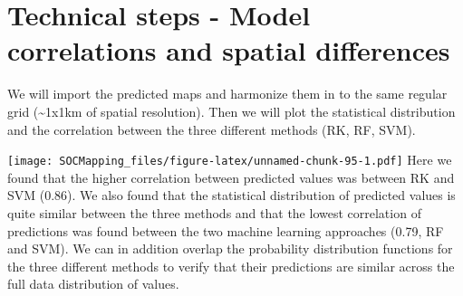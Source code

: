 \documentclass[10pt,b5paper,]{book}
\newenvironment{Shaded}{\begin{snugshade}}{\end{snugshade}}
\newcommand{\CommentTok}[1]{\textcolor[rgb]{0.56,0.35,0.01}{\textit{#1}}}
\newcommand{\DataTypeTok}[1]{\textcolor[rgb]{0.13,0.29,0.53}{#1}}
\newcommand{\KeywordTok}[1]{\textcolor[rgb]{0.13,0.29,0.53}{\textbf{#1}}}
\newcommand{\NormalTok}[1]{#1}
\newcommand{\OtherTok}[1]{\textcolor[rgb]{0.56,0.35,0.01}{#1}}
\newcommand{\StringTok}[1]{\textcolor[rgb]{0.31,0.60,0.02}{#1}}
\theoremstyle{definition}
\theoremstyle{definition}
\theoremstyle{definition}
\theoremstyle{remark}
\begin{document}
\hypertarget{technical-steps---model-correlations-and-spatial-differences}{%
\section{Technical steps - Model correlations and spatial
differences}\label{technical-steps---model-correlations-and-spatial-differences}}

We will import the predicted maps and harmonize them in to the same
regular grid (\textasciitilde{}1x1km of spatial resolution). Then we
will plot the statistical distribution and the correlation between the
three different methods (RK, RF, SVM).

\begin{Shaded}
\end{Shaded}

\texttt{[image: SOCMapping\_files/figure-latex/unnamed-chunk-95-1.pdf]}
Here we found that the higher correlation between predicted values was
between RK and SVM (0.86). We also found that the statistical
distribution of predicted values is quite similar between the three
methods and that the lowest correlation of predictions was found between
the two machine learning approaches (0.79, RF and SVM). We can in
addition overlap the probability distribution functions for the three
different methods to verify that their predictions are similar across
the full data distribution of values.
\end{document}
